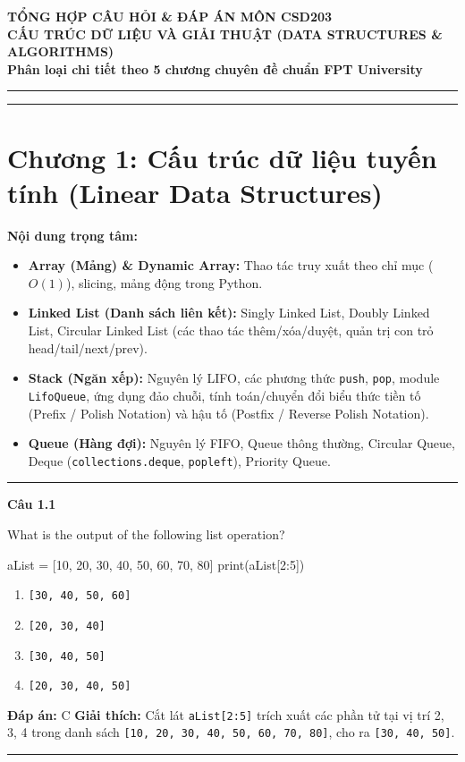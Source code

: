 \documentclass[11pt,a4paper]{article}
\newenvironment{question}[1]{%
  \par\vspace{1em}\noindent\textbf{\large Câu #1}\par\vspace{0.4em}
}{%
  \par\vspace{1em}\hrule\vspace{0.6em}
}
\newenvironment{choices}{%
  \begin{enumerate}[label=\textbf{\Alph*.},leftmargin=2.2em,itemsep=2pt,topsep=3pt]
}{%
  \end{enumerate}
}
\newcommand{\choice}{\item}
\newenvironment{codebox}{%
  \begin{tcolorbox}[colback=gray!8!white,colframe=gray!50!black,arc=1.5mm,boxrule=0.6pt,left=3mm,right=3mm,top=2.5mm,bottom=2.5mm]
  \ttfamily\small
}{%
  \end{tcolorbox}
}
\begin{document}
\begin{center}
  {\LARGE \textbf{TỔNG HỢP CÂU HỎI \& ĐÁP ÁN MÔN CSD203}}\\[0.5em]
  {\Large \textbf{CẤU TRÚC DỮ LIỆU VÀ GIẢI THUẬT (DATA STRUCTURES \& ALGORITHMS)}}\\[0.5em]
  {\normalsize \textbf{Phân loại chi tiết theo 5 chương chuyên đề chuẩn FPT University}}\\[1em]
  \rule{\textwidth}{1.2pt}
\end{center}

\tableofcontents
\bigskip
\rule{\textwidth}{0.5pt}

\newpage
\section*{Chương 1: Cấu trúc dữ liệu tuyến tính (Linear Data Structures)}

\noindent\textbf{Nội dung trọng tâm:}
\begin{itemize}[noitemsep,topsep=3pt]
  \item \textbf{Array (Mảng) \& Dynamic Array:} Thao tác truy xuất theo chỉ mục ($O(1)$), slicing, mảng động trong Python.
  \item \textbf{Linked List (Danh sách liên kết):} Singly Linked List, Doubly Linked List, Circular Linked List (các thao tác thêm/xóa/duyệt, quản trị con trỏ head/tail/next/prev).
  \item \textbf{Stack (Ngăn xếp):} Nguyên lý LIFO, các phương thức \texttt{push}, \texttt{pop}, module \texttt{LifoQueue}, ứng dụng đảo chuỗi, tính toán/chuyển đổi biểu thức tiền tố (Prefix / Polish Notation) và hậu tố (Postfix / Reverse Polish Notation).
  \item \textbf{Queue (Hàng đợi):} Nguyên lý FIFO, Queue thông thường, Circular Queue, Deque (\texttt{collections.deque}, \texttt{popleft}), Priority Queue.
\end{itemize}
\bigskip
\hrule
\bigskip

\begin{question}{1.1}
What is the output of the following list operation?
\begin{codebox}
aList = [10, 20, 30, 40, 50, 60, 70, 80]
print(aList[2:5])
\end{codebox}
\begin{choices}
\choice \texttt{[30, 40, 50, 60]}
\choice \texttt{[20, 30, 40]}
\choice \texttt{[30, 40, 50]}
\choice \texttt{[20, 30, 40, 50]}
\end{choices}
\textbf{Đáp án:} C
\textbf{Giải thích:} Cắt lát \texttt{aList[2:5]} trích xuất các phần tử tại vị trí 2, 3, 4 trong danh sách \texttt{[10, 20, 30, 40, 50, 60, 70, 80]}, cho ra \texttt{[30, 40, 50]}.
\end{question}
\end{document}
